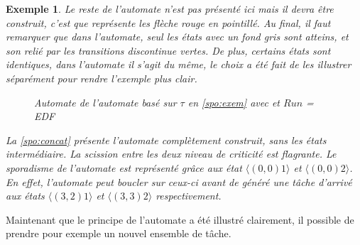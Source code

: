 \documentclass[12pt,a4paper,oneside]{book}
\theoremstyle{break}
\newtheorem{exem}{Exemple}[chapter]
\theoremstyle{breakplain}
\begin{document}
\begin{exem}
Le reste de l'automate n'est pas présenté ici mais il devra être construit, c'est que représente les flèche rouge en pointillé. Au final, il faut remarquer que dans l'automate, seul les états avec un fond gris sont atteins, et son relié par les transitions discontinue vertes. De plus, certains états sont identiques, dans l'automate il s'agit du même, le choix a été fait de les illustrer séparément pour rendre l'exemple plus clair.

\begin{figure}[h]

    \centering
    \def\svgwidth{\columnwidth}
    
    
\caption{Automate de l'automate basé sur $\tau$ en \autoref{spo:exem} avec et $Run$ = EDF}
\label{spo:concat}

\end{figure}

La \autoref{spo:concat} présente l'automate complètement construit, sans les états intermédiaire. La scission entre les deux niveau de criticité est flagrante. Le sporadisme de l'automate est représenté grâce aux état $\langle (0,0)1 \rangle $ et $\langle (0,0)2 \rangle $. En effet, l'automate peut boucler sur ceux-ci avant de généré une tâche d'arrivé aux états $\langle (3,2)1 \rangle $ et $\langle (3,3)2 \rangle $ respectivement.
\end{exem}

Maintenant que le principe de l'automate a été illustré clairement, il possible de prendre pour exemple un nouvel ensemble de tâche.
\end{document}
